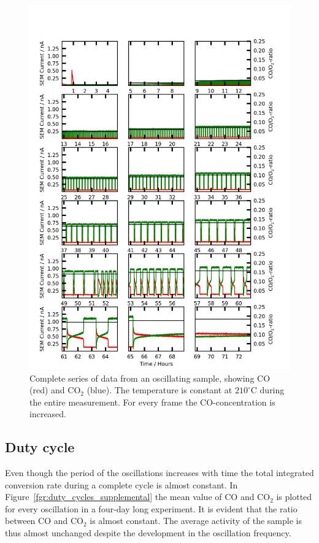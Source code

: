 \documentclass[journal=jacsat,manuscript=article]{achemso}
\begin{document}
\begin{figure}
  \includegraphics[width=14cm]{oscillations_gas_dependence_supplemental.png}
  \caption{Complete series of data from an oscillating sample, showing CO (red) and CO$_2$
  (blue). The temperature is constant at $210^\circ$C during the entire
  measurement. For every frame the CO-concentration is increased.}
  \label{fgr:gas_dependence}
\end{figure}

\subsection{Duty cycle}
Even though the period of the oscillations increases with time the total
integrated conversion rate during a complete cycle is almost constant. In
Figure~\ref{fgr:duty_cycles_supplemental} the mean value of CO and
CO$_2$ is plotted for every oscillation in a four-day long experiment. It is
evident that the ratio between CO and CO$_2$ is almost constant. The
average activity of the sample is thus almost unchanged despite the development in
the oscillation frequency.
\end{document}
